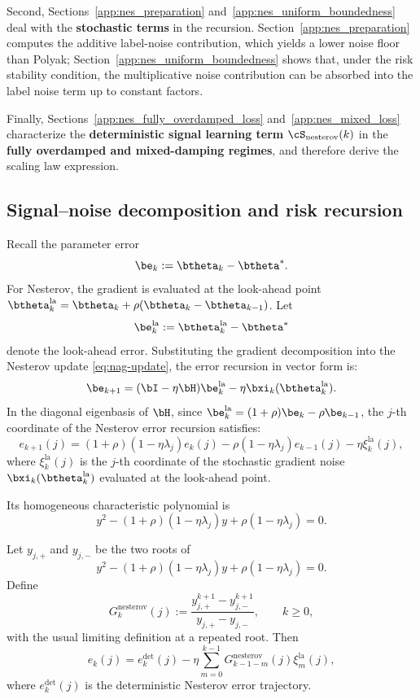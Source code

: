 \documentclass[11pt]{article}
\newcommand{\nesterov}{\mathrm{nesterov}}
\newcommand{\la}{\mathrm{la}}
\begin{document}
Second, Sections~\ref{app:nes_preparation} and~\ref{app:nes_uniform_boundedness} deal with the \textbf{stochastic terms} in the recursion. Section~\ref{app:nes_preparation} computes the additive label-noise contribution, which yields a lower noise floor than Polyak; Section~\ref{app:nes_uniform_boundedness} shows that, under the risk stability condition, the multiplicative noise contribution can be absorbed into the label noise term up to constant factors.

Finally, Sections~\ref{app:nes_fully_overdamped_loss} and~\ref{app:nes_mixed_loss} characterize the \textbf{deterministic signal learning term} \(\cS_{\nesterov}(k)\) in the \textbf{fully overdamped and mixed-damping regimes}, and therefore derive the scaling law expression.


\subsection{Signal--noise decomposition and risk recursion}
\label{app:nes_signal_noise_decomp}

Recall the parameter error 
\[
\be_k := \btheta_k - \btheta^*.
\]
For Nesterov, the gradient is evaluated at the look-ahead point $\btheta_k^{\la} = \btheta_k + \rho(\btheta_k - \btheta_{k-1})$. 
Let 
\[
\be_k^{\la} := \btheta_k^{\la} - \btheta^*
\]
denote the look-ahead error. Substituting the gradient decomposition into the Nesterov update \eqref{eq:nag-update}, the error recursion in vector form is:
\[
    \be_{k+1} = (\bI - \eta \bH)\be_k^{\la} - \eta \bxi_k(\btheta_k^{\la}).
\]
In the diagonal eigenbasis of $\bH$, since $\be_k^{\la} = (1+\rho)\be_k - \rho \be_{k-1}$, the $j$-th coordinate of the Nesterov error recursion satisfies:
\[
    e_{k+1}(j) = (1+\rho)(1-\eta\lambda_j)e_k(j) -\rho(1-\eta\lambda_j)e_{k-1}(j) -\eta\xi_k^{\la}(j),
\]
where $\xi_k^{\la}(j)$ is the $j$-th coordinate of the stochastic gradient noise $\bxi_k(\btheta_k^{\la})$ evaluated at the look-ahead point.

Its homogeneous characteristic polynomial is
\[
    y^2-(1+\rho)(1-\eta\lambda_j)y+\rho(1-\eta\lambda_j)=0.
\]

Let \(y_{j,+}\) and \(y_{j,-}\) be the two roots of
\[
    y^2-(1+\rho)(1-\eta\lambda_j)y+\rho(1-\eta\lambda_j)=0.
\]
Define
\[
    G_k^{\nesterov}(j)
    :=
    \frac{y_{j,+}^{k+1}-y_{j,-}^{k+1}}{y_{j,+}-y_{j,-}},
    \qquad k\ge0,
\]
with the usual limiting definition at a repeated root.  Then
\begin{equation}
\label{eq:nes_impulse_response}
    e_k(j)
    =
    e_k^{\mathrm{det}}(j)
    -\eta\sum_{m=0}^{k-1}G_{k-1-m}^{\nesterov}(j)\xi_m^{\la}(j),
\end{equation}
where $e_k^{\mathrm{det}}(j)$ is the deterministic Nesterov error trajectory.
\end{document}
